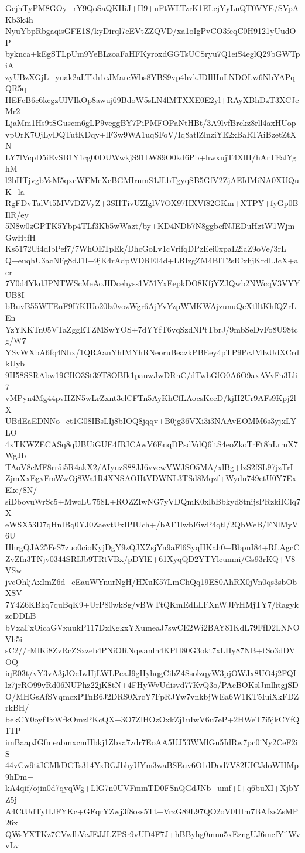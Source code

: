 GejhTyPM8GOy+rY9QoSaQKHiJ+H9+uFtWLTzrK1ELcjYyLnQT0VYE/SVpAKb3k4h
NyuYbpRbgaqisGFE1S/kyDirql7cEVtZZQVD/xa1oIgPvCO3fcqC0H9121yUudOP
byknca+kEgSTLpUm9YeBLzoaFaHFKyroxdGGTsUCSryu7Q1eiS4eglQ29bGWTpiA
zyUBzXGjL+yuak2aLTkh1cJMareWbs8YBS9vp4hvkJDIlHuLNDOLw6NbYAPqQR5q
HEFcB6c6kcgzUIVIkOp8awuj69BdoW5sLN4lMTXXE0E2yl+RAyXBhDzT3XCJeMr2
LjaMm1Hs9tSGuscm6gLP9veggBY7PiPMFOPaNtHBt/3A9lvfBrckz8rll4axHUop
vpOrK7OjLyDQTutKDqy+lF3w9WA1uqSFoV/Iq8atlZlnziYE2xBaRTAiBzetZtXN
LY7lVcpD5iEvSB1Y1cg00DUWwkjS91LW89O0kd6Pb+hwxujT4XlH/hArTFalYghM
l2bHTjvgbVsM5qxcWEMeXcBGMIrnmS1JLbTgyqSB5GfV2ZjAEIdMiNA0XUQuK+la
RgFDvTalVt5MV7DZVyZ+3SHTivUZIglV7OX97HXVf82GKm+XTPY+fyGp0BIlR/ey
5N8w0zGPTK5Ybp4TLf3Kb5wWazt/by+KD4NDb7N8ggbcfNJEDuHztW1WjmGwHtfH
Ks5172Ui4dlbPef7/7WhOETpEk/DhcGoLv1cVrifqDPzEei0xpaL2iaZ9oVe/3rL
Q+euqhU3acNFg8dJ1I+9jK4rAdpWDREI4d+LBIzgZM4BIT2sICxhjKrdLJcX+acr
7Y0d4YkdJPNTWScMeAoJIDcehyss1V51YxEepkDO8KfjYZJQwb2NWcqV3VYYUB8I
bBuvB55WTEnF9I7KIUo20lz0vozWgr6AjYvYzpWMKWAjzunuQcXtlltKhfQZrLEn
YzYKKTn05VTaZggETZMSwYOS+7dYYfT6vqSzdNPtTbrJ/9mbSeDvFo8U98tcg/W7
YSvWXbA6fq4Nhx/1QRAanYhIMYhRNeoruBeazkPBEey4pTP9PcJMIzUdXCrdkUyb
9II58SSRAbw19CIlO3St39T8OBIk1pauwJwDRnC/dTwbGfO0A6O9axAVvFn3Lli7
vMPyn4Mg44pvHZN5wLrZxnt3elCFTn5AyKhCfLAocsKeeD/kjH2Ur9AFs9Kpj2lX
UBdEaEDNNo+ct1G08IBsLIj8bIOQ8jqqv+B0jg36VXi3i3NAAvEOMM6s3yjxLYLO
4xTKWZECASq8qUBUiGUE4fBJCAwV6EnqDPsdVdQ6ltS4eoZkoTrFt8hLrmX7WgJb
TAoV8cMF8rr5i5R4akX2/AIyuzS88JJ6vvewVWJSO5MA/xlBg+lzS2fSL97jzTrI
ZjmXxEgvFmWwOj8Wa1R4XNSAOHtVDWNL3TSd8Mqzf+Wydn749ctU0Y7ExEke/8N/
siDbovuWrSc5+MwcLU758L+ROZZIwNG7yVDQmK0xlbBbkyd8tnijsPRzkiIClq7X
eWSX53D7qHnIBq0YJ0ZaevtUxIPIUch+/bAF1lwbFiwP4qtl/2QbWeB/FNlMyV6U
HhrgQJA25FeS7zuo0cioKyjDgY9zQJXZsjYn9aFl6SyqHKah0+BbpnI84+RLAgcC
ZvZfn3TNjv0344SRIJb9TRtVBx/pDYlE+61XyqQD2YTYlcunmi/Gs93rKQ+V8VSw
jvcOhljAxImZ6d+cEauWYnurNgH/HXuK57LmChQq19ES0AhRX0jVn0qs3sbObXSV
7Y4Z6KBkq7quBqK9+UrP80wkSg/vBWTtQKmEdLLFXnWJFrHMjTY7/RagykzcDDLB
bVxaFxOicaGVxuukP117DxKgkxYXumeaJ7swCE2Wi2BAY81KdL79FfD2LNNOVh5i
sC2//rMlKi8ZvRcZSxzeb4PNiORNqwanln4KPH80G3okt7xLHy87NB+tSo3dDVOQ
iqE03t/vY3vA3jJOcIwHjLWLPeaJ9gHyhqgCibZ4SsolzqyW3pjOWJx8UO4j2FQI
lz7jrRO99vRd06NUPhz22jK8tN+4FHyWvUdisvd77KvQ3o/PAcBOKslJmlhtgjSD
O/MHGsAfSVqmcxPTnB6J2DRS0XrcY7FpRJYw7vnkbjWEa6W1KT5IuiXkFDZrkBH/
bekCY0oyfTxWfkOmzPKcQX+3O7ZlHOzOxkZj1uIwV6u7eP+2HWeT7i5jkCYfQ1TP
imBaapJGfmeabmxcmHbkj1Zbxa7zdr7EoAA5UJ53WMlGu5IdRw7pc0iNy2CeF2iS
44vCw9tiJCMkDCTs314YxBGJbhyUYm3waBSEuv6O1dDod7V82UICJdoWHMp9hDm+
kA4qif/ojin0d7qyqWg+LlG7n0UVFmmTD0FSnQGdJNb+umf+I+q6buXI+XjbYZ5j
A4CtUdTyHJFYKc+GFqrYZwj3f8oss5Tt+VrzG89L97QO2oV0HIm7BAfxsZsMP26x
QWsYXTKz7CVwlbVeJEJJLZPSr9vUD4F7J+hBByhg0mnu5xEzngUJ6mcfYilWvvLv
